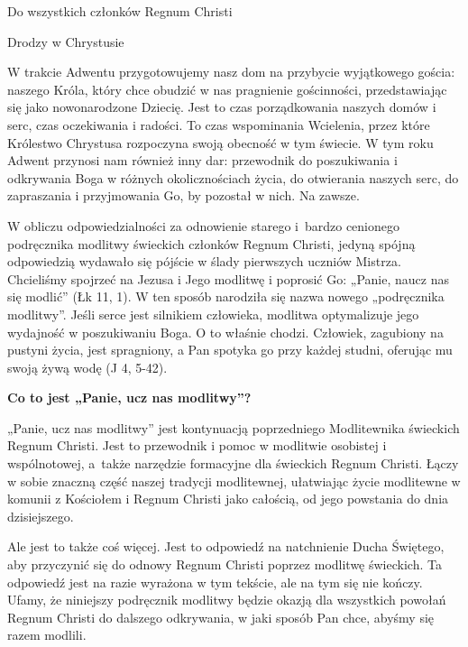 ﻿\documentclass[9pt,twoside]{extarticle}
\newcommand{\ltrhdr}[1]{{\par\noindent\bf #1\par}}
\begin{document}
\vspace{6pt}\par\noindent
Do wszystkich członków Regnum Christi


\vspace{6pt}\par\noindent
Drodzy w Chrystusie


\vspace{6pt}
W trakcie Adwentu przygotowujemy nasz dom na przybycie wyjątkowego gościa: naszego Króla, który chce obudzić w nas pragnienie gościnności, przedstawiając się jako nowonarodzone Dziecię. Jest to czas porządkowania naszych domów i serc, czas oczekiwania i radości. To czas wspominania Wcielenia, przez które Królestwo Chrystusa rozpoczyna swoją obecność w tym świecie. W tym roku Adwent przynosi nam również inny dar: przewodnik do poszukiwania i odkrywania Boga w różnych okolicznościach życia, do otwierania naszych serc, do zapraszania i przyjmowania Go, by pozostał w nich. Na zawsze.


W obliczu odpowiedzialności za odnowienie starego i~bardzo cenionego podręcznika modlitwy świeckich członków Regnum Christi, jedyną spójną odpowiedzią wydawało się pójście w ślady pierwszych uczniów Mistrza. Chcieliśmy spojrzeć na Jezusa i Jego modlitwę i poprosić Go: „Panie, naucz nas się modlić” (Łk 11, 1). W ten sposób narodziła się nazwa nowego „podręcznika modlitwy”. Jeśli serce jest silnikiem człowieka, modlitwa optymalizuje jego wydajność w poszukiwaniu Boga. O to właśnie chodzi. Człowiek, zagubiony na pustyni życia, jest spragniony, a Pan spotyka go przy każdej studni, oferując mu swoją żywą wodę (J 4, 5-42).


\ltrhdr{Co to jest „Panie, ucz nas modlitwy”?}


„Panie, ucz nas modlitwy” jest kontynuacją poprzedniego Modlitewnika świeckich Regnum Christi. Jest to przewodnik i pomoc w modlitwie osobistej i wspólnotowej, a~także narzędzie formacyjne dla świeckich Regnum Christi. Łączy w sobie znaczną część naszej tradycji modlitewnej, ułatwiając życie modlitewne w komunii z Kościołem i Regnum Christi jako całością, od jego powstania do dnia dzisiejszego.


Ale jest to także coś więcej. Jest to odpowiedź na natchnienie Ducha Świętego, aby przyczynić się do odnowy Regnum Christi poprzez modlitwę świeckich. Ta odpowiedź jest na razie wyrażona w tym tekście, ale na tym się nie kończy. Ufamy, że niniejszy podręcznik modlitwy będzie okazją dla wszystkich powołań Regnum Christi do dalszego odkrywania, w jaki sposób Pan chce, abyśmy się razem modlili.
\end{document}
